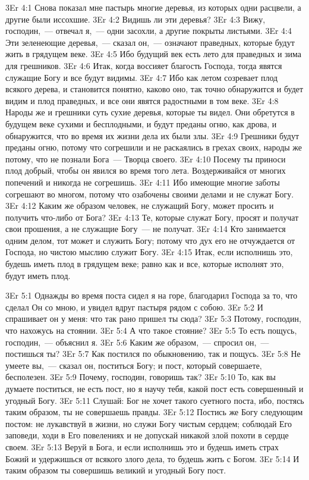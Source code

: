 \vs 3Er 4:1
Снова показал мне пастырь многие деревья, из которых одни
расцвели, а другие были иссохшие.
\vs 3Er 4:2
Видишь ли эти деревья?
\vs 3Er 4:3
Вижу, господин,~--- отвечал
я,~--- одни засохли, а другие покрыты листьями.
\vs 3Er 4:4
Эти зеленеющие деревья,~--- сказал он,~--- означают праведных, которые будут жить в грядущем веке.
\vs 3Er 4:5
Ибо будущий век есть лето
для праведных и зима для грешников.
\vs 3Er 4:6
Итак, когда воссияет
благость Господа, тогда явятся служащие Богу и все будут видимы.
\vs 3Er 4:7
Ибо как летом созревает
плод всякого дерева, и становится понятно, каково оно, так точно обнаружится и
будет видим и плод праведных, и все они явятся радостными в том веке.
\vs 3Er 4:8
Народы же и грешники суть
сухие деревья, которые ты видел. Они обретутся в будущем веке сухими и
бесплодными, и будут преданы огню, как дрова, и обнаружится, что во время их
жизни дела их были злы.
\vs 3Er 4:9
Грешники будут преданы
огню, потому что согрешили и не раскаялись в грехах своих, народы же потому,
что не познали Бога~--- Творца своего.
\vs 3Er 4:10
Посему ты приноси плод
добрый, чтобы он явился во время того лета. Воздерживайся от многих попечений
и никогда не согрешишь.
\vs 3Er 4:11
Ибо имеющие многие заботы
согрешают во многом, потому что озабочены своими делами и не служат Богу.
\vs 3Er 4:12
Каким же образом человек,
не служащий Богу, может просить и получить что-либо от Бога?
\vs 3Er 4:13
Те, которые служат Богу,
просят и получат свои прошения, а не служащие Богу~--- не получат.
\vs 3Er 4:14
Кто занимается одним
делом, тот может и служить Богу; потому что дух его не отчуждается от Господа,
но чистою мыслию служит Богу.
\vs 3Er 4:15
Итак, если исполнишь это,
будешь иметь плод в грядущем веке; равно как и все, которые исполнят это,
будут иметь плод.

\vs 3Er 5:1
Однажды во время поста сидел я на горе, благодарил Господа за
то, что сделал Он со мною, и увидел вдруг пастыря рядом с собою.
\vs 3Er 5:2
И спрашивает он у меня: что так рано пришел ты сюда?
\vs 3Er 5:3
Потому, господин, что нахожусь на стоянии.
\vs 3Er 5:4
А что такое стояние?
\vs 3Er 5:5
То есть пощусь, господин,~--- объяснил я.
\vs 3Er 5:6
Каким же образом,~--- спросил он,~--- постишься ты?
\vs 3Er 5:7
Как постился по обыкновению, так и пощусь.
\vs 3Er 5:8
Не умеете вы,~--- сказал он,
поститься Богу; и пост, который совершаете, бесполезен.
\vs 3Er 5:9
Почему, господин, говоришь так?
\vs 3Er 5:10
То, как вы думаете
поститься, не есть пост, но я научу тебя, какой пост есть совершенный и
угодный Богу.
\vs 3Er 5:11
Слушай: Бог не хочет
такого суетного поста, ибо, постясь таким образом, ты не совершаешь правды.
\vs 3Er 5:12
Постись же Богу следующим
постом: не лукавствуй в жизни, но служи Богу чистым сердцем; соблюдай Его
заповеди, ходи в Его повелениях и не допускай никакой злой похоти в сердце
своем.
\vs 3Er 5:13
Веруй в Бога, и если
исполнишь это и будешь иметь страх Божий и удержишься от всякого злого дела,
то будешь жить с Богом.
\vs 3Er 5:14
И таким образом ты
совершишь великий и угодный Богу пост.

